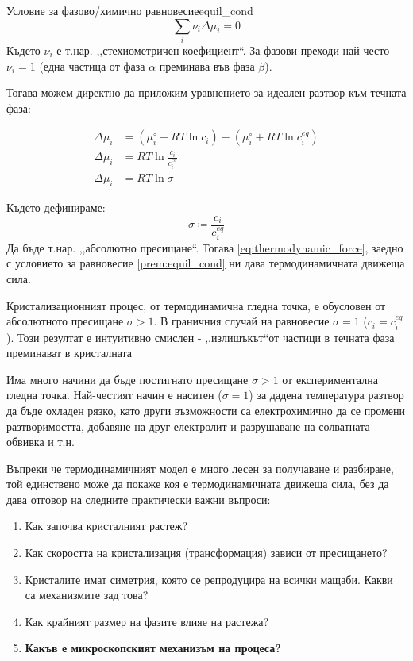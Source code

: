 \begin{premise}{Условие за фазово/химично равновесие}{equil_cond}
	\[\sum\limits_i \nu_i\Delta \mu_i  = 0\]
	Където $\nu_i$ е т.нар. ,,стехиометричен коефициент``. За фазови преходи най-често $\nu_i = 1$ (една частица от фаза $\alpha$ преминава във фаза $\beta$).
\end{premise}

\noindent Тогава можем директно да приложим уравнението за идеален разтвор към течната фаза:

\begin{align}
	\Delta \mu_{i} & = \left( \mu_{i}^\circ + RT\ln{c_i} \right) - \left( \mu_{i}^\circ + RT\ln{c_{i}^{eq}} \right) \nonumber \\
	\Delta \mu_{i} & = RT\ln{\frac{c_i}{c_{i}^{eq}}} \nonumber                                                                \\
	\Delta \mu_{i} & = RT\ln{\sigma} \label{eq:thermodynamic_force}                                                           
\end{align}

\noindent Където дефинираме:
\begin{equation}
	\label{eq:abs_supersat}
	\sigma \coloneqq \frac{c_{i}}{c_{i}^{eq}}
\end{equation}
Да бъде т.нар. ,,абсолютно пресищане``. Тогава \autoref{eq:thermodynamic_force}, заедно с условието за равновесие \autoref{prem:equil_cond} ни дава термодинамичната движеща сила.

Кристализационният процес, от термодинамична гледна точка, е обусловен от абсолютното пресищане $\sigma > 1$. В граничния случай на равновесие $\sigma = 1$ ($c_{i}  = c_{i}^{eq}$). Този резултат е интуитивно смислен - ,,излишъкът``от частици в течната фаза преминават в кристалната \cite{IvanMarkovCGB}

Има много начини да бъде постигнато пресищане $\sigma > 1$ от експериментална гледна точка. Най-честият начин е наситен ($\sigma = 1$) за дадена температура разтвор да бъде охладен рязко, като други възможности са електрохимично да се промени разтворимостта, добавяне на друг електролит и разрушаване на солватната обвивка и т.н. 

Въпреки че термодинамичният модел е много лесен за получаване и разбиране, той единствено може да покаже коя е термодинамичната движеща сила, без да дава отговор на следните практически важни въпроси:
\begin{enumerate}
	\item Как започва кристалният растеж?
	\item Как скоростта на кристализация (трансформация) зависи от пресищането?
	\item Кристалите имат симетрия, която се репродуцира на всички мащаби. Какви са механизмите зад това?
	\item Как крайният размер на фазите влияе на растежа?
	\item \textbf{Какъв е микроскопският механизъм на процеса?}
\end{enumerate}


